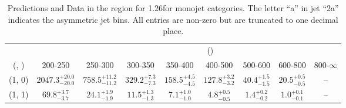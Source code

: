 \begin{table}[h!]
\tiny
\centering
\caption{Predictions and Data in the \mj region for 1.26\ifb for monojet categories. The letter ``a'' in jet \eg ``2a''  indicates the asymmetric jet bins. All entries are non-zero but are truncated to one decimal place.\label{tab:yieldsseppost_mu_wjetstolnuht_mono}}
\begin{tabular}
{ccccccccc}
	\hline\hline
&	& \multicolumn{8}{c}{\scalht (\gev)} \\ 
	 (\njet,  \nb) & 200-250 & 250-300 & 300-350 & 350-400 & 400-500 & 500-600 & 600-800 & 800-$\infty$ \\ [0.8ex] 
\hline
	(1, 0) & $2047.3^{+ 20.0 }_{- 20.0 }$ & $758.5^{+ 11.2 }_{- 11.2 }$ & $329.2^{+ 7.3 }_{- 7.3 }$ & $158.5^{+ 4.5 }_{- 4.5 }$ & $127.8^{+ 3.2 }_{- 3.2 }$ & $40.4^{+ 1.5 }_{- 1.5 }$ & $20.5^{+ 0.5 }_{- 0.5 }$ & -- \\[0.5ex] 
	(1, 1) & $69.8^{+ 3.7 }_{- 3.7 }$ & $24.1^{+ 1.9 }_{- 1.9 }$ & $11.5^{+ 1.3 }_{- 1.3 }$ & $7.1^{+ 1.0 }_{- 1.0 }$ & $4.8^{+ 0.5 }_{- 0.5 }$ & $1.4^{+ 0.2 }_{- 0.2 }$ & $1.0^{+ 0.1 }_{- 0.1 }$ & -- \\[0.5ex] 
	\hline
	\hline
\end{tabular}
\end{table}
